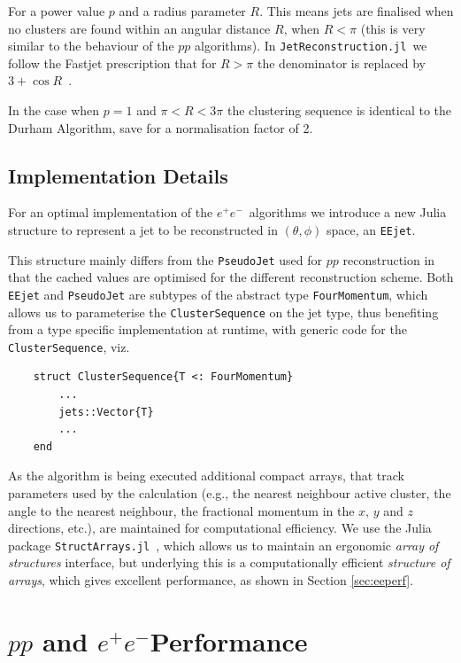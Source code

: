 \documentclass{webofc}
\newcommand{\JR}{\texttt{JetReconstruction.jl}}
\newcommand{\ee}{$e^+e^-$}
\begin{document}
For a power value $p$ and a radius parameter $R$. This means jets are finalised
when no clusters are found within an angular distance $R$, when $R<\pi$ (this is
very similar to the behaviour of the $pp$ algorithms). In \JR\ we follow the
Fastjet prescription that for $R>\pi$ the denominator is replaced by $3+\cos
R$~\cite{fastjetmanual}.

In the case when $p=1$ and $\pi < R < 3\pi$ the clustering sequence is identical
to the Durham Algorithm, save for a normalisation factor of 2.

\subsection{Implementation Details}
\label{eeimplementation}

For an optimal implementation of the \ee\ algorithms we introduce a new Julia
structure to represent a jet to be reconstructed in $(\theta, \phi)$ space, an \texttt{EEjet}.

This structure mainly differs from the \texttt{PseudoJet} used for $pp$
reconstruction in that the cached values are optimised for the different
reconstruction scheme. Both \texttt{EEjet} and \texttt{PseudoJet} are subtypes
of the abstract type \texttt{FourMomentum}, which allows us to parameterise the
\texttt{ClusterSequence} on the jet type, thus benefiting from a type specific
implementation at runtime, with generic code for the \texttt{ClusterSequence}, viz.

\begin{verbatim}
    struct ClusterSequence{T <: FourMomentum}
        ...
        jets::Vector{T}
        ...
    end
\end{verbatim}

As the algorithm is being executed additional compact arrays, that track
parameters used by the calculation (e.g., the nearest neighbour active cluster,
the angle to the nearest neighbour, the fractional momentum in the $x$, $y$ and
$z$ directions, etc.), are maintained for computational efficiency. We use the
Julia package \texttt{StructArrays.jl}~\cite{structarrays}, which allows us to
maintain an ergonomic \emph{array of structures} interface, but underlying this
is a computationally efficient \emph{structure of arrays}, which gives excellent
performance, as shown in Section \ref{sec:eeperf}.

\section{$pp$ and \ee Performance}
\label{sec:performance}
\end{document}
